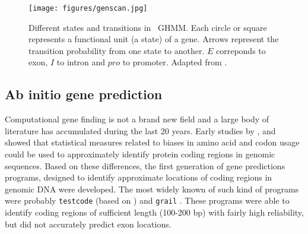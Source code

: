 \begin{figure}
\begin{center}
\texttt{[image: figures/genscan.jpg]}
\caption{Different states and transitions in \genscan\ GHMM. Each 
circle or square represents a functional unit (a state) of a
gene. Arrows represent the transition probability from one state to
another. $E$ correponds to exon, $I$ to intron and $pro$ to
promoter. Adapted from \cite{burge:1997a}.}\label{hmms}
\end{center}
\end{figure}


\subsection{Ab initio gene prediction}

Computational gene finding is not a brand new field and a large body
of literature has accumulated during the last 20 years. Early studies
by \cite{shepherd:1981a}, \cite{fickett:1982a} and \cite{staden:1982a}
showed that statistical measures related to biases in amino acid and
codon usage could be used to approximately identify protein coding
regions in genomic sequences.  Based on these differences, the first
generation of gene predictions programs, designed to identify
approximate locations of coding regions in genomic DNA were
developed. The most widely known of such kind of programs were
probably
\texttt{testcode} (based on \cite{fickett:1982a}) and \texttt{grail}
\citep{uberbacher:1991a}.  These programs were able to identify coding
regions of sufficient length (100-200 bp) with fairly high
reliability, but did not accurately predict exon locations.

